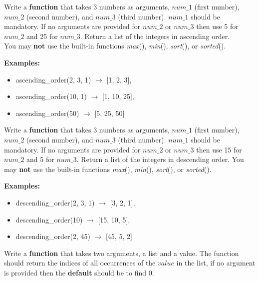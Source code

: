 	\item
		Write a \textbf{function} that takes 3 numbers as arguments, $num\_1$ (first number), 
		$num\_2$ (second number), and $num\_3$ (third number).  $num\_1$ should be mandatory.
		If no arguments are provided for $num\_2$ or $num\_3$ then use 5 for $num\_2$ and 
		25 for $num\_3$.
		Return a list of the integers in ascending order. \\
		You may \textbf{not} use the built-in functions \textit{max}(), \textit{min}(), 
		\textit{sort}(), or \textit{sorted}().
		
	\textbf{Examples:}
	\begin{itemize}
		\item  ascending\_order(2, 3, 1) $\rightarrow$ [1, 2, 3], 
		\item  ascending\_order(10, 1) $\rightarrow$ [1, 10, 25], 
		\item  ascending\_order(50) $\rightarrow$ [5, 25, 50] 
	\end{itemize}


	\item
		Write a \textbf{function} that takes 3 numbers as arguments, $num\_1$ (first number), 
		$num\_2$ (second number), and $num\_3$ (third number).  $num\_1$ should be mandatory.
		If no arguments are provided for $num\_2$ or $num\_3$ then use 15 for $num\_2$ and 
		5 for $num\_3$.
		Return a list of the integers in descending order. 
		You may \textbf{not} use the built-in functions \textit{max}(), \textit{min}(), 
		\textit{sort}(), or \textit{sorted}().
		
	\textbf{Examples:}
	\begin{itemize}
		\item  descending\_order(2, 3, 1) $\rightarrow$ [3, 2, 1], 
		\item  descending\_order(10) $\rightarrow$ [15, 10, 5], 
		\item  descending\_order(2, 45) $\rightarrow$ [45, 5, 2] 
	\end{itemize}


	\item
		Write a \textbf{function} that takes two arguments, a list and a value.  The function 
		should return the indices of all occurrences of the $value$ in the list, 
		if no argument is provided then the \textbf{default} should be to find 0.

